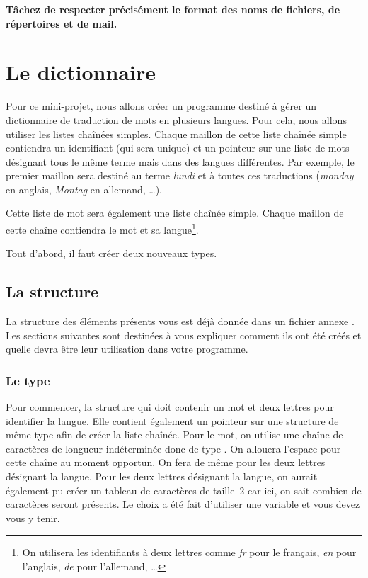 \documentclass[a4paper]{article}
\begin{document}
			\textbf{Tâchez de respecter précisément le format des noms de fichiers, de répertoires et de mail.}
		
			\newpage

	\section{Le dictionnaire}
		Pour ce mini-projet, nous allons créer un programme destiné à gérer un dictionnaire de traduction de mots en plusieurs langues.
		Pour cela, nous allons utiliser les listes chaînées simples.
		Chaque maillon de cette liste chaînée simple contiendra un identifiant (qui sera unique) et un pointeur sur une liste de mots désignant tous le même terme mais dans des langues différentes.
		Par exemple, le premier maillon sera destiné au terme \emph{lundi} et à toutes ces traductions (\emph{monday} en anglais, \emph{Montag} en allemand, \dots{}).

		Cette liste de mot sera également une liste chaînée simple.
		Chaque maillon de cette chaîne contiendra le mot et sa langue\footnote{On utilisera les identifiants à deux lettres comme \emph{fr} pour le français, \emph{en} pour l'anglais, \emph{de} pour l'allemand, \dots{}}.

		Tout d'abord, il faut créer deux nouveaux types.

		\subsection{La structure}
			La structure des éléments présents vous est déjà donnée dans un fichier annexe .
			Les sections suivantes sont destinées à vous expliquer comment ils ont été créés et quelle devra être leur utilisation dans votre programme.
			\subsubsection{Le type }
				Pour commencer, la structure  qui doit contenir un mot et deux lettres pour identifier la langue.
				Elle contient également un pointeur sur une structure de même type afin de créer la liste chaînée.
				Pour le mot, on utilise une chaîne de caractères de longueur indéterminée donc de type .
				On allouera l'espace pour cette chaîne au moment opportun.
				On fera de même pour les deux lettres désignant la langue.
				Pour les deux lettres désignant la langue, on aurait également pu créer un tableau de caractères de taille~2 car ici, on sait combien de caractères seront présents.
				Le choix a été fait d'utiliser une variable  et vous devez vous y tenir.
\end{document}
